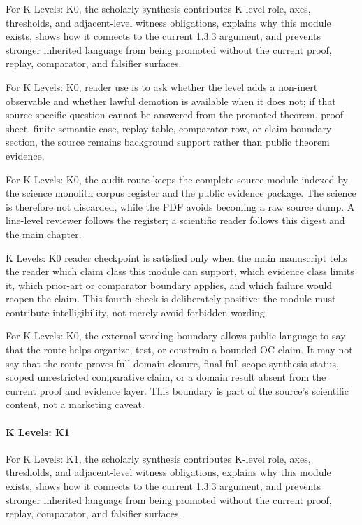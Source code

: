 For K Levels: K0, the scholarly synthesis contributes K-level role, axes, thresholds, and adjacent-level witness obligations, explains why this module exists, shows how it connects to the current 1.3.3 argument, and prevents stronger inherited language from being promoted without the current proof, replay, comparator, and falsifier surfaces.


For K Levels: K0, reader use is to ask whether the level adds a non-inert observable and whether lawful demotion is available when it does not; if that source-specific question cannot be answered from the promoted theorem, proof sheet, finite semantic case, replay table, comparator row, or claim-boundary section, the source remains background support rather than public theorem evidence.


For K Levels: K0, the audit route keeps the complete source module indexed by the science monolith corpus register and the public evidence package. The science is therefore not discarded, while the PDF avoids becoming a raw source dump. A line-level reviewer follows the register; a scientific reader follows this digest and the main chapter.


K Levels: K0 reader checkpoint is satisfied only when the main manuscript tells the reader which claim class this module can support, which evidence class limits it, which prior-art or comparator boundary applies, and which failure would reopen the claim. This fourth check is deliberately positive: the module must contribute intelligibility, not merely avoid forbidden wording.


For K Levels: K0, the external wording boundary allows public language to say that the route helps organize, test, or constrain a bounded OC claim. It may not say that the route proves full-domain closure, final full-scope synthesis status, scoped unrestricted comparative claim, or a domain result absent from the current proof and evidence layer. This boundary is part of the source's scientific content, not a marketing caveat.


\paragraph{K Levels: K1}

For K Levels: K1, the scholarly synthesis contributes K-level role, axes, thresholds, and adjacent-level witness obligations, explains why this module exists, shows how it connects to the current 1.3.3 argument, and prevents stronger inherited language from being promoted without the current proof, replay, comparator, and falsifier surfaces.


